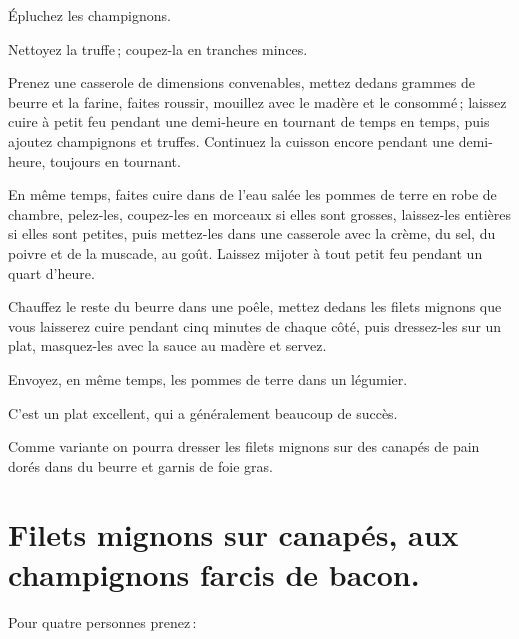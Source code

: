 Épluchez les champignons.

Nettoyez la truffe ; coupez-la en tranches minces.

Prenez une casserole de dimensions convenables, mettez dedans {\mmm} grammes de
beurre et la farine, faites roussir, mouillez avec le madère et le consommé ;
laissez cuire à petit feu pendant une demi-heure en tournant de temps en temps,
puis ajoutez champignons et truffes. Continuez la cuisson encore pendant une
demi-heure, toujours en tournant.

En même temps, faites cuire dans de l’eau salée les pommes de terre en robe
de chambre, pelez-les, coupez-les en morceaux si elles sont grosses, laissez-les
entières si elles sont petites, puis mettez-les dans une casserole avec la crème,
du sel, du poivre et de la muscade, au goût. Laissez mijoter à tout petit feu
pendant un quart d'heure.

Chauffez le reste du beurre dans une poêle, mettez dedans les filets mignons
que vous laisserez cuire pendant cinq minutes de chaque côté, puis dressez-les
sur un plat, masquez-les avec la sauce au madère et servez.

Envoyez, en même temps, les pommes de terre dans un légumier.

C'est un plat excellent, qui a généralement beaucoup de succès.

\sk

Comme variante on pourra dresser les filets mignons sur des canapés de pain
dorés dans du beurre et garnis de foie gras.

\section*{\centering Filets mignons sur canapés, aux champignons farcis de bacon.}
{}

Pour quatre personnes prenez :

\medskip

